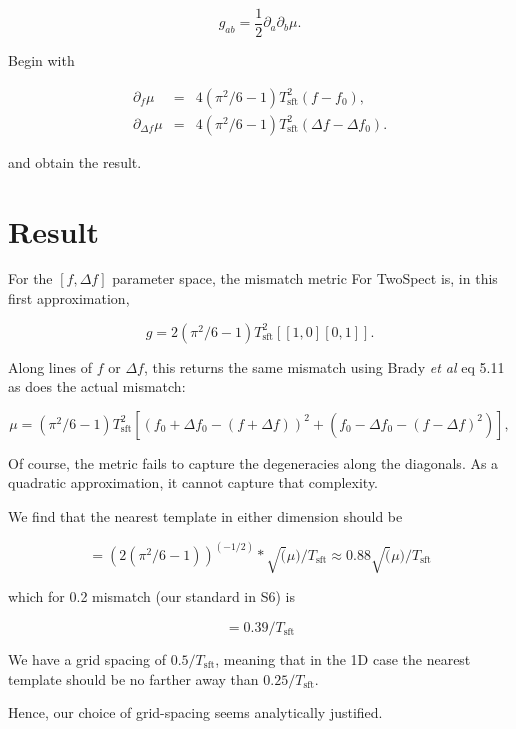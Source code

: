\documentclass{article}
\begin{document}
\begin{equation}
g_{ab} = \frac{1}{2} \partial_a \partial_b \mu.
\end{equation}

\noindent Begin with

\begin{eqnarray}
\partial_f \mu &=& 4(\pi^2/6 -1) T_\mathrm{sft}^2 (f-f_0),\\
\partial_{\Delta f} \mu &=& 4(\pi^2/6-1) T_\mathrm{sft}^2 (\Delta f - \Delta f_0).
\end{eqnarray}

\noindent and obtain the result.

\section{Result}

For the $[f, \Delta f]$ parameter space, the mismatch metric For TwoSpect is, in this first approximation,

\begin{equation}
  g = 2(\pi^2/6 - 1) T_\mathrm{sft}^2  [[1, 0][0, 1]].
\end{equation}

Along lines of $f$ or $\Delta f$, this returns
the same mismatch using Brady \textit{et al} eq 5.11 as does the actual mismatch:

\begin{equation}
\mu = (\pi^2/6 -1) T_\mathrm{sft}^2 
        [(f_0 + \Delta f_0 - (f + \Delta f))^2 + (f_0 - \Delta f_0 - (f - \Delta f)^2) ],
\end{equation}

Of course, the metric
fails to capture the degeneracies along the diagonals.
As a quadratic approximation, it cannot capture that complexity.

We find that the nearest template in either dimension should be

\begin{equation}
[f-f0] = (2 (\pi^2/6 - 1))^(-1/2) * \sqrt(\mu) / T_\mathrm{sft}
       \approx 0.88 \sqrt(\mu) / T_\mathrm{sft}
\end{equation}

\noindent
which for 0.2 mismatch (our standard in S6) is

\begin{equation}
[f-f0] = 0.39/T_\mathrm{sft}
\end{equation}

We have a grid spacing of $0.5/T_\mathrm{sft}$, meaning that in the 1D case the
nearest template should be no farther away than $0.25/T_\mathrm{sft}$.

Hence, our choice of grid-spacing seems analytically justified.
\end{document}
